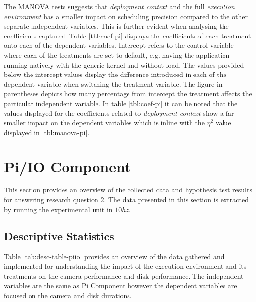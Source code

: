 The MANOVA tests suggests that \textit{deployment context} and the full \textit{execution environment} has a smaller impact on scheduling precision compared to the other separate independent variables. This is further evident when analysing the coefficients captured. Table \ref{tbl:coef-pi} displays the coefficients of each treatment onto each of the dependent variables. Intercept refers to the control variable where each of the treatments are set to default, e.g. having the application running natively with the generic kernel and without load. The values provided below the intercept values display the difference introduced in each of the dependent variable when switching the treatment variable. The figure in parentheses depicts how many percentage from intercept the treatment affects the particular independent variable. In table \ref{tbl:coef-pi} it can be noted that the values displayed for the coefficients related to \textit{deployment context} show a far smaller impact on the dependent variables which is inline with the $\eta^{2}$ value displayed in \ref{tbl:manova-pi}.




\section{Pi/IO Component}
\label{section:analysis-piiocomponent}

This section provides an overview of the collected data and hypothesis test results for answering research question 2. The data presented in this section is extracted by running the experimental unit in $10hz$.

\subsection{Descriptive Statistics}

Table \ref{tab:desc-table-piio} provides an overview of the data gathered and implemented for understanding the impact of the execution environment and its treatments on the camera performance and disk performance. The independent variables are the same as Pi Component however the dependent variables are focused on the camera and disk durations.


